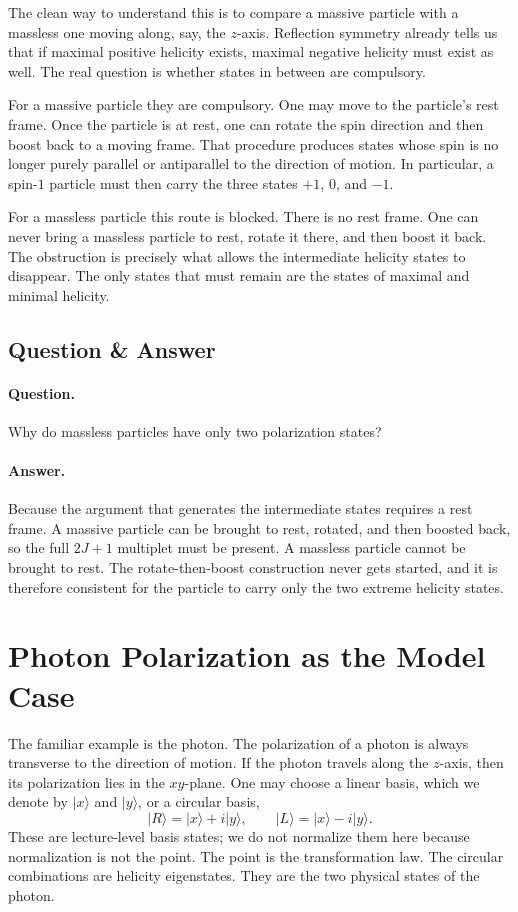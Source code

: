 The clean way to understand this is to compare a massive particle with a massless one moving along, say, the \(z\)-axis. Reflection symmetry already tells us that if maximal positive helicity exists, maximal negative helicity must exist as well. The real question is whether states in between are compulsory.

For a massive particle they are compulsory. One may move to the particle's rest frame. Once the particle is at rest, one can rotate the spin direction and then boost back to a moving frame. That procedure produces states whose spin is no longer purely parallel or antiparallel to the direction of motion. In particular, a spin-\(1\) particle must then carry the three states \(+1\), \(0\), and \(-1\).

For a massless particle this route is blocked. There is no rest frame. One can never bring a massless particle to rest, rotate it there, and then boost it back. The obstruction is precisely what allows the intermediate helicity states to disappear. The only states that must remain are the states of maximal and minimal helicity.

\subsection{Question \& Answer}

\paragraph{Question.} Why do massless particles have only two polarization states?

\paragraph{Answer.} Because the argument that generates the intermediate states requires a rest frame. A massive particle can be brought to rest, rotated, and then boosted back, so the full \(2J+1\) multiplet must be present. A massless particle cannot be brought to rest. The rotate-then-boost construction never gets started, and it is therefore consistent for the particle to carry only the two extreme helicity states.

\section{Photon Polarization as the Model Case}

The familiar example is the photon. The polarization of a photon is always transverse to the direction of motion. If the photon travels along the \(z\)-axis, then its polarization lies in the \(xy\)-plane. One may choose a linear basis, which we denote by \(|x\rangle\) and \(|y\rangle\), or a circular basis,
\begin{equation}
|R\rangle = |x\rangle + i|y\rangle,\qquad
|L\rangle = |x\rangle - i|y\rangle.
\end{equation}
These are lecture-level basis states; we do not normalize them here because normalization is not the point. The point is the transformation law. The circular combinations are helicity eigenstates. They are the two physical states of the photon.

